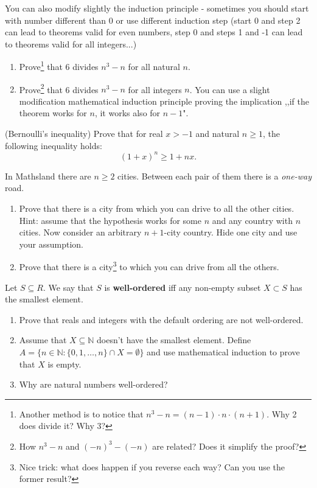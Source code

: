 \noindent You can also modify slightly the induction principle - sometimes you should start with number different than 0 or use different induction step
(start 0 and step 2 can lead to theorems valid for even numbers, step 0 and steps 1 and -1 can lead to theorems valid for all integers...)
\begin{prob}
    \begin{enumerate}
	   \item Prove\footnote{Another method is to notice that $n^3-n=(n-1)\cdot n\cdot (n+1)$. Why 2 does divide it? Why 3?} that 6 divides
		     $n^3-n$ for all natural $n$.
	    \item Prove\footnote{How $n^3-n$ and $(-n)^3-(-n)$ are related? Does it simplify the proof?} that 6 divides $n^3-n$ for all integers $n$.
		      You can use a slight modification mathematical induction principle proving the implication
		      ,,if the theorem works for $n$, it works also for $n-1$".
    \end{enumerate}
\end{prob}

\begin{prob}
	(Bernoulli's inequality) Prove that for real $x > -1$ and natural $n\ge 1$, the following inequality holds:
	$$(1+x)^n\ge 1+nx.$$
\end{prob}

\begin{prob}
	In Mathsland there are $n\ge 2$ cities. Between each pair of them there is a \textit{one-way} road.
	\begin{enumerate}
		\item Prove that there is a city from which you can drive to all the other cities. Hint: assume that the hypothesis works for some $n$ and any
			country with $n$ cities. Now consider an arbitrary $n+1$-city country. Hide one city and use your assumption.
		\item Prove that there is a city\footnote{Nice trick: what does happen if you reverse each way? Can you use the former result?}
			to which you can drive from all the others.
	\end{enumerate}
\end{prob}

\begin{prob}
	Let $S\subseteq R$. We say that $S$ is \textbf{well-ordered} iff any non-empty subset $X\subset S$ has the smallest element.
	\begin{enumerate}
		\item Prove that reals and integers with the default ordering are not well-ordered.
		\item Assume that $X\subseteq \mathbb N$ doesn't have the smallest element. Define $A=\{n\in \mathbb N : \{0,1,\dots,n\}\cap X=\emptyset\}$
			and use mathematical induction to prove that $X$ is empty.
		\item Why are natural numbers well-ordered?
	\end{enumerate}
\end{prob}

